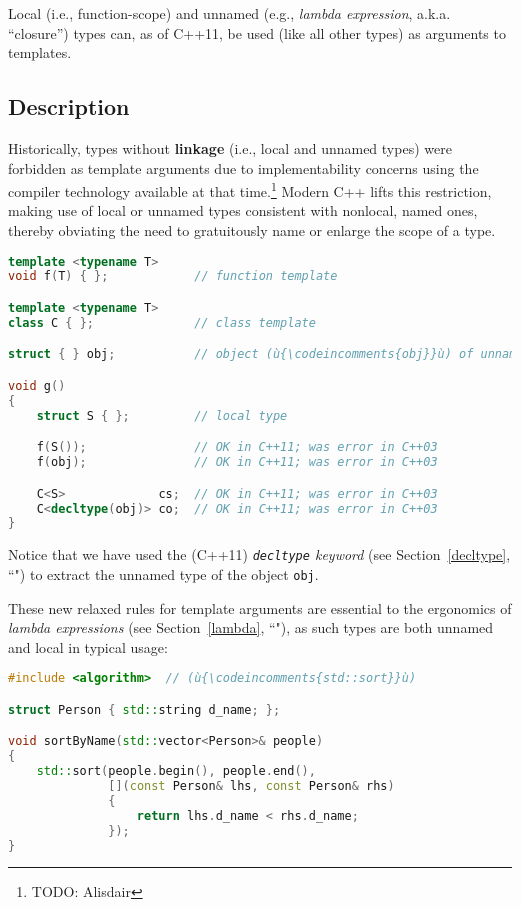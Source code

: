 
Local (i.e., function-scope) and unnamed (e.g., \textit{lambda
expression}, a.k.a. ``closure'') types can, as of C++11, be used (like all other
types) as arguments to templates.

\subsection[Description]{Description}\label{description}

Historically, types without \textbf{linkage} (i.e., local and unnamed
types) were forbidden as template arguments due to implementability
concerns using the compiler technology available at that
time.{\cprotect\footnote{TODO: Alisdair}} Modern C++ lifts this
restriction, making use of local or unnamed types consistent with
nonlocal, named ones, thereby obviating the need to gratuitously name
or enlarge the scope of a type.

\begin{lstlisting}[language=C++]
template <typename T>
void f(T) { };            // function template

template <typename T>
class C { };              // class template

struct { } obj;           // object (ù{\codeincomments{obj}}ù) of unnamed C++ type

void g()
{
    struct S { };         // local type

    f(S());               // OK in C++11; was error in C++03
    f(obj);               // OK in C++11; was error in C++03

    C<S>             cs;  // OK in C++11; was error in C++03
    C<decltype(obj)> co;  // OK in C++11; was error in C++03
}
\end{lstlisting}
    
\noindent Notice that we have used the (C++11) {\it \texttt{decltype}
keyword} (see Section~\ref{decltype}, ``") to extract the unnamed type of the object \texttt{obj}.

These new relaxed rules for template arguments are essential to the
ergonomics of {\it lambda expressions} (see Section~\ref{lambda}, ``"), as such types are both
unnamed and local in typical usage:

\begin{lstlisting}[language=C++]
#include <algorithm>  // (ù{\codeincomments{std::sort}}ù)

struct Person { std::string d_name; };

void sortByName(std::vector<Person>& people)
{
    std::sort(people.begin(), people.end(),
              [](const Person& lhs, const Person& rhs)
              {
                  return lhs.d_name < rhs.d_name;
              });
}
\end{lstlisting}
    
